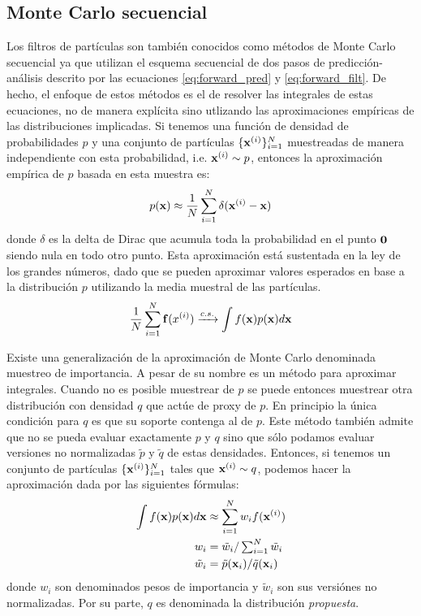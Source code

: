 \subsection{Monte Carlo secuencial}

Los filtros de partículas son también conocidos como métodos de Monte Carlo secuencial ya que utilizan el esquema secuencial de dos pasos de predicción-análisis descrito por las ecuaciones \ref{eq:forward_pred} y \ref{eq:forward_filt}. De hecho, el enfoque de estos métodos es el de resolver las integrales de estas ecuaciones, no de manera explícita sino utlizando las aproximaciones empíricas de las distribuciones implicadas. Si tenemos una función de densidad de probabilidades $p$ y una conjunto de partículas $\{\mathbf{x}^{(i)}\}_{i=1}^N$ muestreadas de manera independiente con esta probabilidad, i.e. $\mathbf{x}^{(i)}\sim p$, entonces la aproximación empírica de $p$ basada en esta muestra es:
\begin{align*}
    p(\mathbf{x}) \approx \frac{1}{N}\sum_{i=1}^N \delta(\mathbf{x}^{(i)} - \mathbf{x})
\end{align*}
donde $\delta$ es la delta de Dirac que acumula toda la probabilidad en el punto $\mathbf{0}$ siendo nula en todo otro punto. Esta aproximación está sustentada en la ley de los grandes números, dado que se pueden aproximar valores esperados en base a la distribución $p$ utilizando la media muestral de las partículas.
\begin{align*}
    \frac{1}{N}\sum_{i=1}^N \mathbf{f}(x^{(i)}) \xrightarrow{c. s.} \int f(\mathbf{x}) p(\mathbf{x}) d \mathbf{x}
\end{align*}

Existe una generalización de la aproximación de Monte Carlo denominada muestreo de importancia. A pesar de su nombre es un método para aproximar integrales. Cuando no es posible muestrear de $p$ se puede entonces muestrear otra distribución con densidad $q$ que actúe de proxy de $p$. En principio la única condición para $q$ es que su soporte contenga al de $p$. Este método también admite que no se pueda evaluar exactamente $p$ y $q$ sino que sólo podamos evaluar versiones no normalizadas $\tilde{p}$ y $\tilde{q}$ de estas densidades. Entonces, si tenemos un conjunto de partículas $\{\mathbf{x}^{(i)}\}_{i=1}^N$ tales que $\mathbf{x}^{(i)}\sim q$, podemos hacer la aproximación dada por las siguientes fórmulas:
\begin{align*}
    \int f(\mathbf{x}) p(\mathbf{x}) d \mathbf{x} &\approx \sum_{i=1}^N w_i f(\mathbf{x}^{(i)}) \\
    w_i &= \tilde{w}_i / \textstyle\sum_{i=1}^N \tilde{w}_i \\
    \tilde{w}_i &= \tilde{p}(\mathbf{x}_i) / \tilde{q}(\mathbf{x}_i)
\end{align*}
donde $w_i$ son denominados pesos de importancia y $\tilde{w}_i$ son sus versiónes no normalizadas. Por su parte, $q$ es denominada la distribución \textit{propuesta}.

